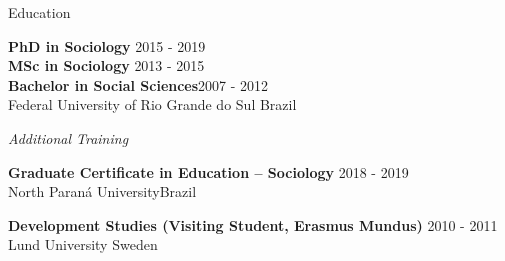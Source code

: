 \begin{rSection}{Education}

{\bf PhD in Sociology} \hfill {2015 - 2019} \\
{\bf MSc in Sociology} \hfill {2013 - 2015} \\
{\bf Bachelor in Social Sciences}\hfill {2007 - 2012}\\
{Federal University of Rio Grande do Sul} \hfill {Brazil}

\par
\emph{Additional Training}
\par

{\textbf{Graduate Certificate in Education – Sociology }}{\hfill  2018 - 2019}\\ 
{North Paraná University}\hfill{Brazil}\par
{\bf Development Studies (Visiting Student, Erasmus Mundus)} \hfill 
{2010 - 2011} \\
{Lund University} \hfill {Sweden} 

\end{rSection}